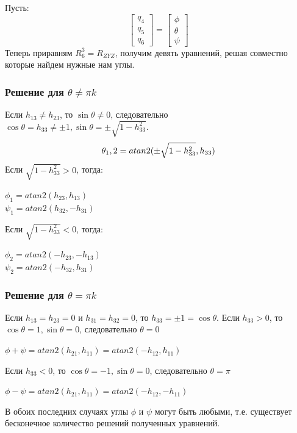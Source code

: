 \documentclass[a4paper,14pt]{extreport}
\begin{document}
	Пусть:
	\begin{equation}
		\begin{bmatrix}
			q_4\\
			q_5\\
			q_6
		\end{bmatrix}
		=
		\begin{bmatrix}
			\phi\\
			\theta\\
			\psi
		\end{bmatrix}
	\end{equation}	
	Теперь приравням $R^3_6 = R_{ZYZ}$, получим девять уравнений, решая совместно которые найдем нужные нам углы.
	
	\subsubsection{Решение для $\theta \neq \pi k$} 
	Если $h_{13} \neq h_{23}$, то $\sin{\theta} \neq 0$, следовательно $\cos{\theta} = h_{33}\neq \pm 1, \sin{\theta} = \pm \sqrt{1 - h_{33}^2}$.
	\begin{equation}
		\theta_1,2 = atan2(\pm \sqrt{1 - h_{33}^2}, h_{33})\\
	\end{equation}		
	Если $\sqrt{1 - h_{33}^2} > 0$, тогда:
	\begin{center}
		$\phi_1 = atan2(h_{23}, h_{13})$\\
		$\psi_1 = atan2(h_{32}, -h_{31})$
	\end{center}
	Если $\sqrt{1 - h_{33}^2} < 0$, тогда:
	\begin{center}
		$\phi_2 = atan2(-h_{23}, -h_{13})$\\
		$\psi_2 = atan2(-h_{32}, h_{31})$
	\end{center}

	\subsubsection{Решение для $\theta = \pi k$}
	Если $h_{13} = h_{23} = 0$ и $h_{31} = h_{32} = 0$, то $h_{33} = \pm 1 = \cos \theta$.
	Если $h_{33} > 0$, то $\cos{\theta} = 1, \sin{\theta} = 0$, следовательно $\theta = 0$
	\begin{center}
		$\phi + \psi = atan2(h_{21}, h_{11}) = atan2(-h_{12}, h_{11})$
	\end{center}
	Если $h_{33} < 0$, то $\cos{\theta} = -1, \sin \theta = 0$, следовательно $\theta = \pi$
	\begin{center}
		$\phi - \psi = atan2(h_{21},h_{11}) = atan2(-h_{12}, -h_{11})$
	\end{center}
	В обоих последних случаях углы $\phi$ и $\psi$ могут быть любыми, т.е. существует бесконечное количество решений полученных уравнений.
	
\end{document}
